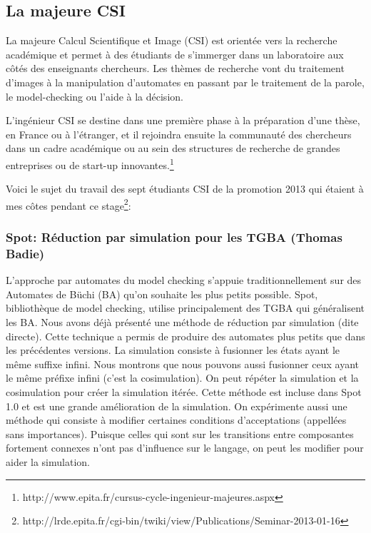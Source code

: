 \documentclass[a4paper,11pt,twoside,final]{article}
\begin{document}
  \subsection{La majeure CSI}

  La majeure Calcul Scientifique et Image (CSI) est orientée vers la recherche
  académique et permet à des étudiants de s'immerger dans un laboratoire aux
  côtés des enseignants chercheurs. Les thèmes de recherche vont du traitement
  d'images à la manipulation d'automates en passant par le traitement de la
  parole, le model-checking ou l'aide à la décision.

  L'ingénieur CSI se destine dans une première phase à la préparation d'une
  thèse, en France ou à l'étranger, et il rejoindra ensuite la communauté des
  chercheurs dans un cadre académique ou au sein des structures de recherche de
  grandes entreprises ou de start-up innovantes.\footnote{%
  http://www.epita.fr/cursus-cycle-ingenieur-majeures.aspx}

  Voici le sujet du travail des sept étudiants CSI de la promotion 2013 qui
  étaient à mes côtes pendant ce stage\footnote{%
  http://lrde.epita.fr/cgi-bin/twiki/view/Publications/Seminar-2013-01-16}:

  \subsubsection*{Spot: Réduction par simulation pour les TGBA (Thomas Badie)}

  L'approche par automates du model checking s'appuie traditionnellement sur
  des Automates de Büchi (BA) qu'on souhaite les plus petits possible. Spot,
  bibliothèque de model checking, utilise principalement des TGBA qui
  généralisent les BA\@. Nous avons déjà présenté une méthode de réduction par
  simulation (dite directe). Cette technique a permis de produire des automates
  plus petits que dans les précédentes versions.  La simulation consiste à
  fusionner les états ayant le même suffixe infini. Nous montrons que nous
  pouvons aussi fusionner ceux ayant le même préfixe infini (c'est la
  cosimulation). On peut répéter la simulation et la cosimulation pour créer la
  simulation itérée. Cette méthode est incluse dans Spot 1.0 et est une grande
  amélioration de la simulation.  On expérimente aussi une méthode qui consiste
  à modifier certaines conditions d'acceptations (appellées sans importances).
  Puisque celles qui sont sur les transitions entre composantes fortement
  connexes n'ont pas d'influence sur le langage, on peut les modifier pour
  aider la simulation.
\end{document}
